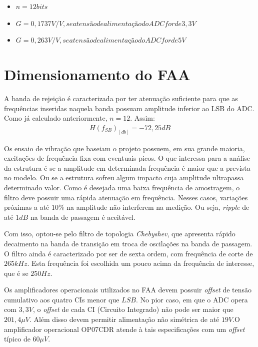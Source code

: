 \documentclass[
	12pt,				%
	openright,			%
	twoside,			%
	a4paper,			%
	english,			%
	french,				%
	spanish,			%
	brazil,				%
	]{abntex2}
\begin{document}
		\begin{itemize}	
			\item $n = 12 bits$
			\item $G = 0,1737 V/V, se a tensão de alimentação do ADC for de 3,3V$
			\item $G = 0,263 V/V, se a tensão de alimentação do ADC for de 5V$
		\end{itemize}	

	\section{Dimensionamento do FAA}

		A banda de rejeição é caracterizada por ter atenuação
		suficiente para que as frequências inseridas naquela banda possuam amplitude
		inferior ao LSB do ADC. Como já calculado anteriormente, $n=12$. Assim:
		\begin{gather*}
			H(f_{SB})_{[db]} = -72,25 dB
		\end{gather*}

		Os ensaio de vibração que baseiam o projeto possuem, em sua grande
		maioria, excitações de frequência fixa com eventuais picos. O que
		interessa para a análise da estrutura é se a amplitude em
		determinada frequência é maior que a prevista no modelo. Ou se a
		estrutura sofreu algum impacto cuja amplitude ultrapassa determinado
		valor. Como é desejada uma baixa frequência de amostragem, o filtro deve possuir uma rápida atenuação em frequência. Nesses casos, variações próximas a até $10\%$ na amplitude não interferem na medição. Ou seja, \textit{ripple} de até $1dB$ na banda de passagem é aceitável.

		Com isso, optou-se pelo filtro de topologia
		\textit{Chebyshev}, que apresenta rápido decaimento na banda de transição em troca de oscilações na banda de passagem. O filtro ainda é caracterizado por ser de sexta ordem, com
		frequência de corte de $265kHz$. Esta frequência foi escolhida um
		pouco acima da frequência de interesse, que é se $250Hz$.

		Os amplificadores operacionais utilizados no FAA devem
		possuir \textit{offset} de tensão cumulativo aos quatro CIs
		menor que $LSB$. No pior caso, em que o ADC opera com $3,3V$,
		o \textit{offset} de cada CI (Circuito Integrado) não pode ser
		maior que $201,4\mu V$. Além disso devem permitir alimentação
		não simétrica de até $19V$.O amplificador operacional OP07CDR atende à tais especificações com um \textit{offset} típico de $60\mu V$.
\end{document}
